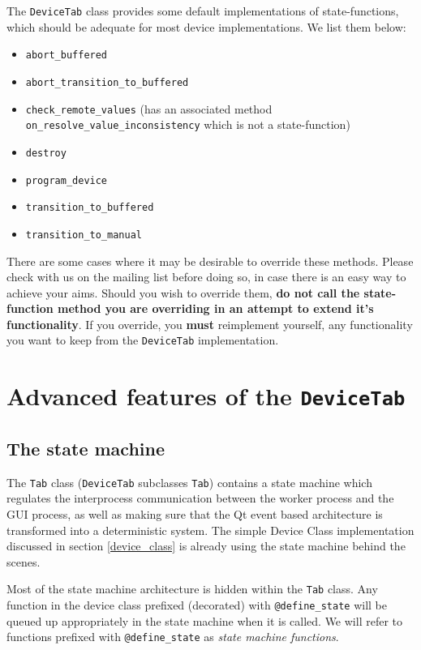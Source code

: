 \documentclass[12pt]{article}
\begin{document}
The \texttt{DeviceTab} class provides some default implementations of state-functions, which should be adequate for most device implementations.
We list them below:

\begin{itemize}
\item \texttt{abort\_buffered}
\item \texttt{abort\_transition\_to\_buffered}
\item \texttt{check\_remote\_values} (has an associated method \texttt{on\_resolve\_value\_inconsistency} which is not a state-function)
\item \texttt{destroy}
\item \texttt{program\_device}
\item \texttt{transition\_to\_buffered}
\item \texttt{transition\_to\_manual}
\end{itemize}

There are some cases where it may be desirable to override these methods.
Please check with us on the mailing list before doing so, in case there is an easy way to achieve your aims.
Should you wish to override them, \textbf{do not call the state-function method you are overriding in an attempt to extend it's functionality}.
If you override, you \textbf{must} reimplement yourself, any functionality you want to keep from the \texttt{DeviceTab} implementation.





\newpage
\section{Advanced features of the \texttt{DeviceTab}}
\subsection{The state machine}\label{device_class_state_machine}
The \texttt{Tab} class (\texttt{DeviceTab} subclasses \texttt{Tab}) contains a state machine which regulates the interprocess communication between the worker process and the GUI process, as well as making sure that the Qt event based architecture is transformed into a deterministic system. 
The simple Device Class implementation discussed in section \ref{device_class} is already using the state machine behind the scenes.

Most of the state machine architecture is hidden within the \texttt{Tab} class. 
Any function in the device class prefixed (decorated) with \texttt{@define\_state} will be queued up appropriately in the state machine when it is called.
We will refer to functions prefixed with \texttt{@define\_state} as \textit{state machine functions}.
\end{document}
